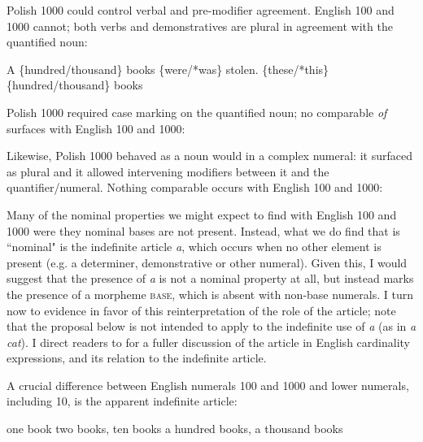 \documentclass[output=paper]{langscibook}
\begin{document}
Polish 1000 could control verbal and pre-modifier agreement. English 100 and 1000 cannot; both verbs and demonstratives are plural in agreement with the quantified noun:

\ea 
\ea A \{hundred/thousand\} books \{were/*was\} stolen. 
\ex \{these/*this\} \{hundred/thousand\} books
\z \z

\noindent Polish 1000 required case marking on the quantified noun; no comparable \textit{of} surfaces with English 100 and 1000:

\z

\noindent Likewise, Polish 1000 behaved as a noun would in a complex numeral: it surfaced as plural and it allowed intervening modifiers between it and the quantifier/numeral. Nothing comparable occurs with English 100 and 1000:

\ea 
{}
\z \z

\noindent Many of the nominal properties we might expect to find with English 100 and 1000 were they nominal bases are not present. Instead, what we do find that is ``nominal" is the indefinite article \textit{a}, which occurs when no other element is present (e.g. a determiner, demonstrative or other numeral).
Given this, I would suggest that the presence of \textit{a} is not a nominal property at all, but instead marks the presence of a morpheme \textsc{base}, which is absent with non-base numerals. I turn now to evidence in favor of this reinterpretation of the role of the article; note that the proposal below is not intended to apply to the indefinite use of \textit{a} (as in \textit{a cat}). I  direct readers to \citet{klockmann2020} for a fuller discussion of the article in English cardinality expressions, and its relation to the indefinite article.

A crucial difference between English numerals 100 and 1000 and lower numerals, including 10, is the apparent indefinite article:

\ea 
\ea one book
\ex two books, ten books
\ex a hundred books, a thousand books
\z \z
\end{document}
